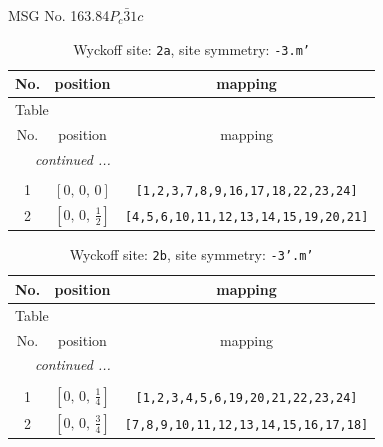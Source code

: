 \documentclass[fleqn,8pt]{jsarticle}
\begin{document}
\setcounter{MaxMatrixCols}{32}

\renewcommand{\tablename}{Table~}
\renewcommand{\figurename}{Figure~}
\begin{center}
\LARGE
MSG No. 163.84\quad$P_{c}\bar{3}1c$
\end{center}
\renewcommand{\arraystretch}{1.2}
\begin{longtable}{ccc}
\caption{Wyckoff site: {\tt 2a}, site symmetry: {\tt -3.m'}}
 \\
 \hline \hline
No. & position & mapping \\ \hline \endfirsthead

\multicolumn{2}{l}{\tablename\ \thetable{}} \\
 \hline \hline
No. & position & mapping \\ \hline \endhead

 \hline \hline
\multicolumn{2}{r}{\footnotesize\it continued ...} \\ \endfoot

 \hline \hline
\multicolumn{2}{r}{} \\ \endlastfoot

1 & $\left[ 0,\, 0,\, 0 \right]$ & {\tt [1,2,3,7,8,9,16,17,18,22,23,24]} \\ \hline
2 & $\left[ 0,\, 0,\, \frac{1}{2} \right]$ & {\tt [4,5,6,10,11,12,13,14,15,19,20,21]} \\
\end{longtable}
\renewcommand{\arraystretch}{1.2}
\begin{longtable}{ccc}
\caption{Wyckoff site: {\tt 2b}, site symmetry: {\tt -3'.m'}}
 \\
 \hline \hline
No. & position & mapping \\ \hline \endfirsthead

\multicolumn{2}{l}{\tablename\ \thetable{}} \\
 \hline \hline
No. & position & mapping \\ \hline \endhead

 \hline \hline
\multicolumn{2}{r}{\footnotesize\it continued ...} \\ \endfoot

 \hline \hline
\multicolumn{2}{r}{} \\ \endlastfoot

1 & $\left[ 0,\, 0,\, \frac{1}{4} \right]$ & {\tt [1,2,3,4,5,6,19,20,21,22,23,24]} \\ \hline
2 & $\left[ 0,\, 0,\, \frac{3}{4} \right]$ & {\tt [7,8,9,10,11,12,13,14,15,16,17,18]} \\
\end{longtable}
\end{document}

